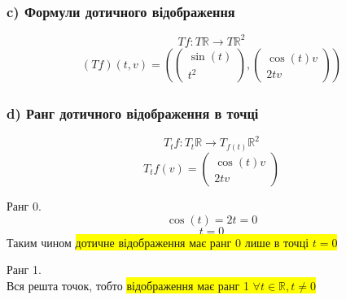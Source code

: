 \documentclass[10pt, a4paper]{article} %
\newcommand{\R}{\mathbb{R}}
\begin{document}
\subsubsection*{c) Формули дотичного відображення}
\[Tf : T\R \to T\R^2\]
\begin{align*}
    (Tf)(t, v) = \left(\begin{pmatrix}
        \sin(t) \\ t^2
    \end{pmatrix}, \begin{pmatrix}
        \cos(t)v \\ 2tv
    \end{pmatrix}\right)
\end{align*}

\subsubsection*{d) Ранг дотичного відображення в точці}
\[T_{t}f: T_{t}\R \to T_{f(t)}\R^2\]
\[T_{t}f(v) = \begin{pmatrix}
    \cos(t)v \\ 2tv
\end{pmatrix}\]

Ранг 0.
\[\cos(t) = 2t = 0\]
\[t = 0\]
Таким чином \colorbox{yellow}{дотичне відображення має ранг 0 лише в точці $t=0$}

Ранг 1.\\
Вся решта точок, тобто \colorbox{yellow}{відображення має ранг 1 $\forall t \in \R, t\ne 0$}
\end{document}

